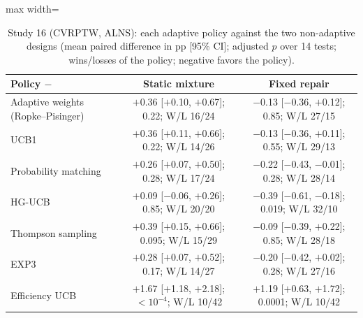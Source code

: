 \begin{table}[t]
\caption{Study 16 (CVRPTW, ALNS): each adaptive policy against the two non-adaptive designs (mean paired difference in pp [95\% CI]; adjusted $p$ over 14 tests; wins/losses of the policy; negative favors the policy).}\label{tab:s16m}
\centering
\small
\begin{adjustbox}{max width=\linewidth}
\begin{tabular}{lcc}
\toprule
Policy $-$ & Static mixture & Fixed repair \\
\midrule
Adaptive weights (Ropke--Pisinger) & $+$0.36 [$+$0.10, $+$0.67]; 0.22; W/L 16/24 & $-$0.13 [$-$0.36, $+$0.12]; 0.85; W/L 27/15 \\
UCB1 & $+$0.36 [$+$0.11, $+$0.66]; 0.22; W/L 14/26 & $-$0.13 [$-$0.36, $+$0.11]; 0.55; W/L 29/13 \\
Probability matching & $+$0.26 [$+$0.07, $+$0.50]; 0.28; W/L 17/24 & $-$0.22 [$-$0.43, $-$0.01]; 0.28; W/L 28/14 \\
HG-UCB & $+$0.09 [$-$0.06, $+$0.26]; 0.85; W/L 20/20 & $-$0.39 [$-$0.61, $-$0.18]; 0.019; W/L 32/10 \\
Thompson sampling & $+$0.39 [$+$0.15, $+$0.66]; 0.095; W/L 15/29 & $-$0.09 [$-$0.39, $+$0.22]; 0.85; W/L 28/18 \\
EXP3 & $+$0.28 [$+$0.07, $+$0.52]; 0.17; W/L 14/27 & $-$0.20 [$-$0.42, $+$0.02]; 0.28; W/L 27/16 \\
Efficiency UCB & $+$1.67 [$+$1.18, $+$2.18]; \ensuremath{<10^{-4}}; W/L 10/42 & $+$1.19 [$+$0.63, $+$1.72]; 0.0001; W/L 10/42 \\
\bottomrule
\end{tabular}
\end{adjustbox}
\end{table}
